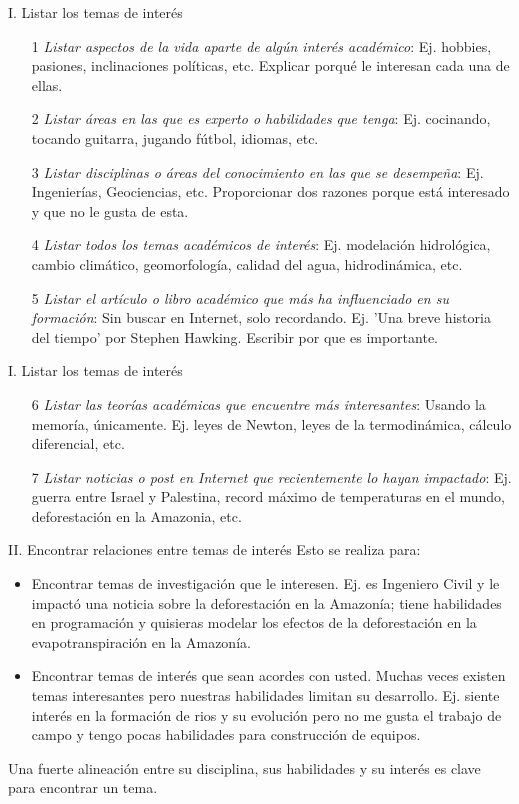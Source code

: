 \documentclass [xcolor=svgnames, t] {beamer}
\begin{document}
\begin{frame}{I. Listar los temas de inter\'es}
\begin{enumerate}
\item[1] \emph{Listar aspectos de la vida aparte de alg\'un inter\'es acad\'emico}: Ej. hobbies, pasiones, inclinaciones pol\'iticas, etc. Explicar porqu\'e le interesan cada una de ellas.
\item[2] \emph{Listar \'areas en las que es experto o habilidades que tenga}: Ej. cocinando, tocando guitarra, jugando fútbol, idiomas, etc.
\item[3] \emph{Listar disciplinas o \'areas del conocimiento en las que se desempe\~na}: Ej. Ingenier\'ias, Geociencias, etc. Proporcionar dos razones porque est\'a interesado y que no le gusta de esta.
\item[4] \emph{Listar todos los temas acad\'emicos de inter\'es}: Ej. modelaci\'on hidrológica, cambio clim\'atico, geomorfolog\'ia, calidad del agua, hidrodin\'amica, etc. 
\item[5] \emph{Listar el art\'iculo o libro  acad\'emico que m\'as ha influenciado en su formaci\'on}: Sin buscar en Internet, solo recordando. Ej. 'Una breve historia del tiempo' por Stephen Hawking. Escribir por que es importante.  
\end{enumerate}
\end{frame}

\begin{frame}{I. Listar los temas de inter\'es}
\begin{enumerate}
\item[6] \emph{Listar las teor\'ias acad\'emicas que encuentre m\'as interesantes}: Usando la memor\'ia, \'unicamente. Ej. leyes de Newton, leyes de la termodin\'amica, c\'alculo diferencial, etc. 
\item[7] \emph{Listar noticias o post en Internet que recientemente lo hayan impactado}: Ej. guerra entre Israel y Palestina, record m\'aximo de temperaturas en el mundo, deforestaci\'on en la Amazonia, etc.  
\end{enumerate}
\end{frame}


\begin{frame}{II. Encontrar relaciones entre temas de inter\'es}
Esto se realiza para:
\begin{itemize}
\item Encontrar temas de investigaci\'on que le interesen. Ej. es Ingeniero Civil y le impact\'o una noticia sobre la deforestaci\'on en la Amazon\'ia; tiene habilidades en programaci\'on y quisieras modelar los efectos de la deforestaci\'on en la evapotranspiraci\'on en la Amazon\'ia.
\item Encontrar temas de inter\'es que sean acordes con usted. Muchas veces existen temas interesantes pero nuestras habilidades limitan su desarrollo. Ej. siente inter\'es en la formaci\'on de rios y su evoluci\'on pero no me gusta el trabajo de campo y tengo pocas habilidades para construcci\'on de equipos. 
\end{itemize}
\centering
\alert{Una fuerte alineaci\'on entre su disciplina, sus habilidades y su inter\'es es clave para encontrar un tema.}
\end{frame}
\end{document}
